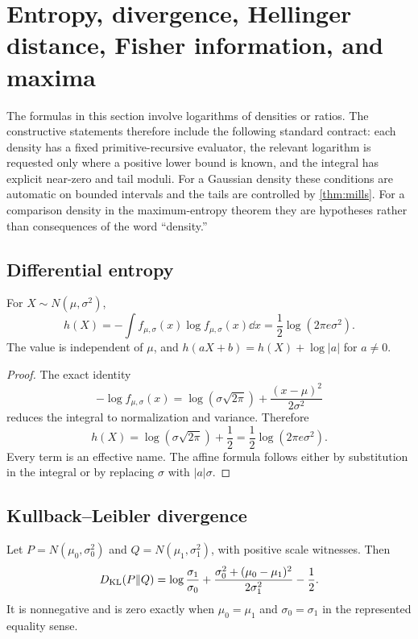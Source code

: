 \section{Entropy, divergence, Hellinger distance, Fisher information, and maxima}\label{sec:information}

The formulas in this section involve logarithms of densities or ratios.  The constructive statements therefore include the following standard contract: each density has a fixed primitive-recursive evaluator, the relevant logarithm is requested only where a positive lower bound is known, and the integral has explicit near-zero and tail moduli.  For a Gaussian density these conditions are automatic on bounded intervals and the tails are controlled by \cref{thm:mills}.  For a comparison density in the maximum-entropy theorem they are hypotheses rather than consequences of the word ``density.''

\subsection{Differential entropy}

\begin{theorem}\label{thm:entropy}
For $X\sim N(\mu,\sigma^2)$,
\begin{equation}\label{eq:entropy}
 h(X)=-\int f_{\mu,\sigma}(x)\log f_{\mu,\sigma}(x)\dd x
 =\frac12\log(2\pi e\sigma^2).
\end{equation}
The value is independent of $\mu$, and $h(aX+b)=h(X)+\log|a|$ for $a\ne0$.
\end{theorem}

\begin{proof}
The exact identity
\[
 -\log f_{\mu,\sigma}(x)
 =\log(\sigma\sqrt{2\pi})+\frac{(x-\mu)^2}{2\sigma^2}
\]
reduces the integral to normalization and variance.  Therefore
\[
 h(X)=\log(\sigma\sqrt{2\pi})+\frac12
 =\frac12\log(2\pi e\sigma^2).
\]
Every term is an effective name.  The affine formula follows either by substitution in the integral or by replacing $\sigma$ with $|a|\sigma$.
\end{proof}

\subsection{Kullback--Leibler divergence}

\begin{theorem}\label{thm:kl-normal}
Let $P=N(\mu_0,\sigma_0^2)$ and $Q=N(\mu_1,\sigma_1^2)$, with positive scale witnesses.  Then
\begin{equation}\label{eq:kl-normal}
 D_{\mathrm{KL}}(P\Vert Q)
 =\log\frac{\sigma_1}{\sigma_0}
 +\frac{\sigma_0^2+(\mu_0-\mu_1)^2}{2\sigma_1^2}-\frac12.
\end{equation}
It is nonnegative and is zero exactly when $\mu_0=\mu_1$ and $\sigma_0=\sigma_1$ in the represented equality sense.
\end{theorem}

